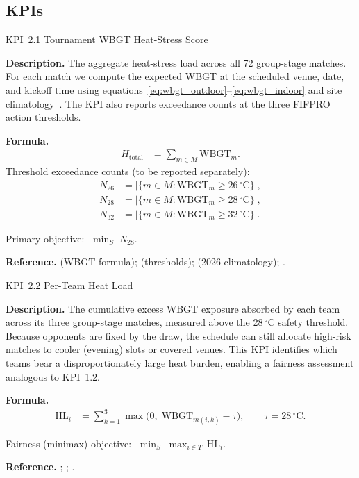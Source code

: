 \documentclass[12pt, letterpaper]{article}
\newcommand{\kpilabel}[1]{\noindent\textbf{#1}\enspace}
\begin{document}
\subsection{KPIs}

\begin{kpibox}{KPI~2.1 \textendash{} Tournament WBGT Heat-Stress Score}

\kpilabel{Description.}
The aggregate heat-stress load across all 72 group-stage matches.
For each match we compute the expected WBGT at the scheduled venue,
date, and kickoff time using
equations~\eqref{eq:wbgt_outdoor}--\eqref{eq:wbgt_indoor} and site
climatology~\citep{Liljegren2008}.  The KPI also reports exceedance
counts at the three FIFPRO action thresholds.

\medskip
\kpilabel{Formula.}
\begin{align*}
  H_{\mathrm{total}} &= \sum_{m \in M} \mathrm{WBGT}_m.
\end{align*}
Threshold exceedance counts (to be reported separately):
\begin{align*}
  N_{26} &= \bigl|\{m \in M : \mathrm{WBGT}_m \geq
            26\,^\circ\text{C}\}\bigr|,\\
  N_{28} &= \bigl|\{m \in M : \mathrm{WBGT}_m \geq
            28\,^\circ\text{C}\}\bigr|,\\
  N_{32} &= \bigl|\{m \in M : \mathrm{WBGT}_m \geq
            32\,^\circ\text{C}\}\bigr|.
\end{align*}
\vspace{-8pt}

\noindent
Primary objective: $\;\displaystyle\min_{S}\;N_{28}$.

\medskip
\kpilabel{Reference.}
\citet{Liljegren2008} (WBGT formula); \citet{FIFPRO2025} (thresholds);
\citet{MullanEtAl2025} (2026 climatology);
\citet{WorldWeatherAttribution2026}.
\end{kpibox}

\begin{kpibox}{KPI~2.2 \textendash{} Per-Team Heat Load}

\kpilabel{Description.}
The cumulative excess WBGT exposure absorbed by each team across its
three group-stage matches, measured above the 28\,$^\circ$C safety
threshold.  Because opponents are fixed by the draw, the schedule can
still allocate high-risk matches to cooler (evening) slots or covered
venues.  This KPI identifies which teams bear a disproportionately large
heat burden, enabling a fairness assessment analogous to KPI~1.2.

\medskip
\kpilabel{Formula.}
\begin{align*}
  \mathrm{HL}_i &= \sum_{k=1}^{3}
    \max\!\bigl(0,\;\mathrm{WBGT}_{m(i,k)} - \tau\bigr),
  \qquad \tau = 28\,^\circ\text{C}.
\end{align*}
\vspace{-8pt}

\noindent
Fairness (minimax) objective:
$\;\displaystyle\min_{S}\;\max_{i \in T}\,\mathrm{HL}_i$.

\medskip
\kpilabel{Reference.}
\citet{FIFPRO2025}; \citet{MullanEtAl2025}; \citet{Liljegren2008}.
\end{kpibox}
\end{document}
